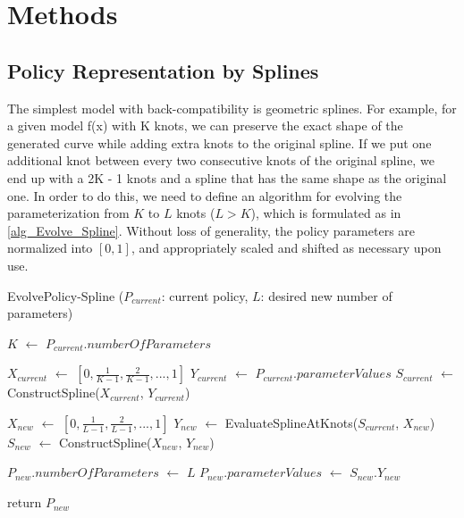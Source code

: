 \section{Methods}

\subsection{Policy Representation by Splines}
The simplest model with back-compatibility is geometric
splines. For example, for a given model f(x) with K knots, we can preserve the
exact shape of the generated curve while adding extra knots to the
original spline. If we put one additional knot between every two
consecutive knots of the original spline, we end up with a 2K - 1
knots and a spline that has the same shape as the original one. In
order to do this, we need to define an algorithm for evolving the
parameterization from $K$ to $L$ knots ($L > K$), which is formulated as in
\ref{alg_Evolve_Spline}.  Without loss of generality, the policy parameters are
normalized into $[0, 1]$, and appropriately scaled and shifted as necessary upon use.

\begin{algorithm}
\caption{EvolvePolicy-Spline ($P_{current}$: current policy, $L$: desired new number of parameters)}
\label{alg_Evolve_Spline}
\begin{algorithmic}[1]

\STATE $K$ $\leftarrow$ $P_{current}.numberOfParameters$

\STATE $X_{current}$ $\leftarrow$ $[0, \frac{1}{K-1}, \frac{2}{K-1}, ... , 1]$ %
\STATE $Y_{current}$ $\leftarrow$ $P_{current}.parameterValues$ %
\STATE $S_{current}$ $\leftarrow$ ConstructSpline($X_{current}$, $Y_{current}$) %

\STATE $X_{new}$ $\leftarrow$ $[0, \frac{1}{L-1}, \frac{2}{L-1}, ... , 1]$
\STATE $Y_{new}$ $\leftarrow$ EvaluateSplineAtKnots($S_{current}$, $X_{new}$)
\STATE $S_{new}$ $\leftarrow$ ConstructSpline($X_{new}$, $Y_{new}$)

\STATE $P_{new}.numberOfParameters$ $\leftarrow$ $L$
\STATE $P_{new}.parameterValues$ $\leftarrow$ $S_{new}$.$Y_{new}$

\STATE return $P_{new}$

\end{algorithmic}
\end{algorithm}



